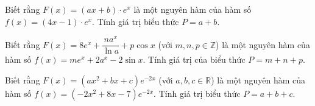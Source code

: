 \begin{ex}%
Biết rằng $F(x)=(ax+b)\cdot e^x$ là một nguyên hàm của hàm số $f(x)=(4x-1)\cdot e^x$. Tính giá trị biểu thức $P=a+b$.
\end{ex}

\begin{ex}%
Biết rằng $F(x)=8e^x+\dfrac{na^x}{\ln a}+p\cos x$ (với $m,n,p\in \mathbb{Z}$) là một nguyên hàm của hàm số $f(x)=me^x+2a^x-2\sin x$. Tính giá trị của biểu thức $P=m+n+p$.
\end{ex}

\begin{ex}%
Biết rằng  $F(x)=(ax^2+bx+c)e^{-2x}$ (với $a,b,c\in \mathbb{R}$) là một nguyên hàm của hàm số $f(x)=(-2x^2+8x-7)e^{-2x}$. Tính giá trị biểu thức $P=a+b+c$.
\end{ex}
